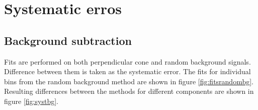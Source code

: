 \section{Systematic erros}

\subsection{Background subtraction}
Fits are performed on both perpendicular cone and random background signals. Difference between them is taken as the systematic error. The fits for individual bins from the random background method are shown in figure \ref{fig:fitsrandombg}. Resulting differences between the methods for different components are shown in figure \ref{fig:systbg}.




